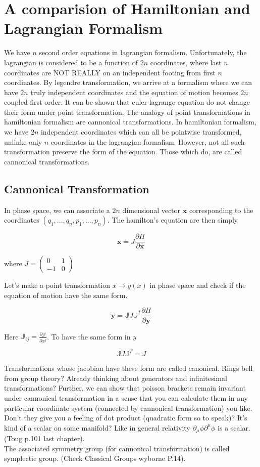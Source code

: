 \documentclass{report}
\begin{document}
\section{A comparision of Hamiltonian and Lagrangian Formalism}

We have $n$ second order equations in lagrangian formalism. Unfortunately, the lagrangian is considered to be a function of $2n$ coordinates, where last $n$ coordinates are NOT REALLY on an independent footing from first $n$ coordinates. By legendre transformation, we arrive at a formalism where we can have $2n$ truly independent coordinates and the equation of motion becomes $2n$ coupled first order. It can be shown that euler-lagrange equation do not change their form under point transformation. The analogy of point transformations in hamiltonian formalism are cannonical transformations. In hamiltonian formalism, we have $2n$ independent coordinates which can all be pointwise transformed, unlinke only $n$ coordinates in the lagrangian formalism. However, not all such transformation preserve the form of the equation. Those which do, are called cannonical transformations.

\subsection{Cannonical Transformation}

In phase space, we can associate a $2n$ dimensional vector $\boldsymbol{x}$ corresponding to the coordinates $(q_1,...,q_n,p_1,...,p_n)$. The hamilton's equation are then simply

$$\boldsymbol{\dot{x}} = J\frac{\partial H}{\partial \boldsymbol{x}}$$

\noindent where $ J = \begin{pmatrix}
  0 & 1\\
  -1 & 0
\end{pmatrix}$

\noindent Let's make a point transformation $x \rightarrow y(x)$ in phase space and check if the equation of motion have the same form.

$$\boldsymbol{\dot{y}} = \mathbb{J}J\mathbb{J}^T\frac{\partial H}{\partial \boldsymbol{y}}$$

\noindent Here $\mathbb{J}_{ij} = \frac{\partial y^i}{\partial x^j}$. To have the same form in $y$

$$\mathbb{J}J\mathbb{J}^T = J$$

\noindent Transformations whose jacobian have these form are called canonical. Rings bell from group theory? Already thinking about generators and infinitesimal transformations? Further, we can show that poisson brackets remain invariant under cannonical transformation in a sense that you can calculate them in any particular coordinate system (connected by cannonical transformation) you like. Don't they give you a feeling of dot product (quadratic form so to speak)? It's kind of a scalar on some manifold? Like in general relativity $\partial_\mu\phi\partial^\mu\phi$ is a scalar. (Tong p.101 last chapter).\\ The associated symmetry group (for cannonical transformation) is called symplectic group. (Check Classical Groups wyborne P.14).
\end{document}
